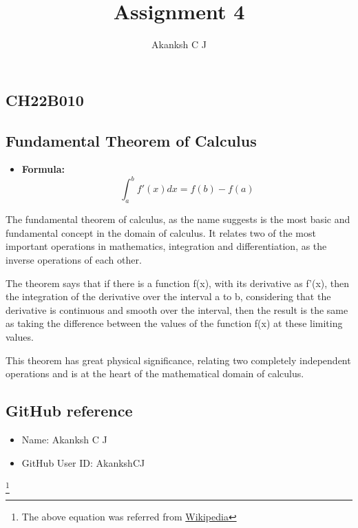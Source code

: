 \documentclass{article}
\title{Assignment 4}
\author{Akanksh C J}
\date{}
\begin{document}
\maketitle

\begin{center} \section*{CH22B010} \subsection*{Fundamental Theorem of Calculus} \end{center}
\begin{itemize} \item \textbf{Formula:} 
{\Large $$ \int_a^bf'(x)dx = f(b) - f(a) $$}
\end{itemize}

\par The fundamental theorem of calculus, as the name suggests is the most basic and fundamental concept in the domain of calculus. It relates two of the most important operations in mathematics, integration and differentiation, as the inverse operations of each other.
\par The theorem says that if there is a function f(x), with its derivative as f'(x), then the integration of the derivative over the interval a to b, considering that the derivative is continuous and smooth over the interval, then the result is the same as taking the difference between the values of the function f(x) at these limiting values.
\par This theorem has great physical significance, relating two completely independent operations and is at the heart of the mathematical domain of calculus.

\begin{center} \subsection*{GitHub reference} \end{center}
\begin{itemize} \item Name: Akanksh C J
\item GitHub User ID: AkankshCJ
\end{itemize}
\footnote{The above equation was referred from \href{https://en.wikipedia.org/wiki/Fundamental_theorem_of_calculus}{Wikipedia}}
\end{document}
